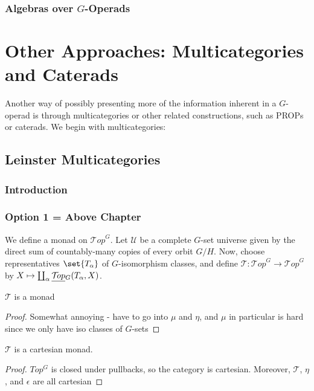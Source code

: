 \documentclass{report}
\newcommand{\Top}{\text{$\mathcal{T}\!op$}}
\newcommand{\TopG}{\text{\underline{$\Top$}$_G$}}
\begin{document}
\subsection{Algebras over $G$-Operads}




\chapter{Other Approaches: Multicategories and Caterads}
Another way of possibly presenting more of the information inherent in a $G$-operad is through multicategories or other related constructions, such as PROPs or caterads. We begin with multicategories:

\section{Leinster Multicategories}
\subsection{Introduction}
\newcommand{\T}{\text{$\mathcal{T}$}}

\subsection{Option 1 = Above Chapter}
We define a monad on $\Top^G$. Let $\mathcal{U}$ be a complete $G$-set universe given by the direct sum of countably-many copies of every orbit $G/H$. Now, choose representatives $\set{T_\alpha}$ of $G$-isomorphism classes, and define $\T: \Top^G\to \Top^G$ by $X\mapsto \coprod_\alpha\TopG(T_\alpha, X)$. 
\begin{lemma}
  $\T$ is a monad
\end{lemma}
\begin{proof}
  Somewhat annoying  - have to go into $\mu$ and $\eta$, and $\mu$ in particular is hard since we only have iso classes of $G$-sets
\end{proof}
\begin{lemma}
  $\T$ is a cartesian monad.
\end{lemma}
\begin{proof}
  $Top^G$ is closed under pullbacks, so the category is cartesian. Moreover, $\T$, $\eta$, and $\epsilon$ are all cartesian
\end{proof}
\end{document}
